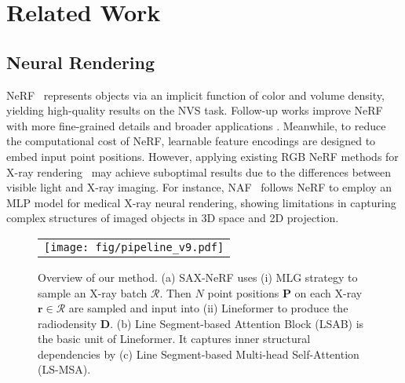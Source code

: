 \documentclass[10pt,twocolumn,letterpaper]{article}
\begin{document}
\vspace{-0.3mm}
\section{Related Work}
\label{sec:rela}
\vspace{-0.2mm}

\subsection{Neural Rendering}
\vspace{-0.2mm}

NeRF~\cite{nerf} represents objects via an implicit function of color and volume density, yielding high-quality results on the NVS task. 
Follow-up works improve NeRF with more fine-grained details \cite{mipnerf21, barron2022mipnerf360} and broader applications  \cite{chen2022hallucinated, xu2022point, wang2022rodin}.
Meanwhile, to reduce the computational cost of NeRF, learnable feature encodings \cite{instant_ngp, tensorf, chen2023neurbf} are designed to embed input point positions.
However, applying existing RGB NeRF methods for X-ray rendering~\cite{naf,mednerf,neat} may achieve suboptimal results due to the differences between visible light and X-ray imaging. For instance, NAF~\cite{naf} follows NeRF to employ an MLP model for medical X-ray neural rendering, showing limitations in capturing complex structures of imaged objects in 3D space and 2D projection.


\begin{figure*}[htp]
	\begin{center}
		\begin{tabular}[t]{c} \hspace{-2.8mm}
			\texttt{[image: fig/pipeline\_v9.pdf]}
		\end{tabular}
	\end{center}
	\vspace*{-6mm}
	\caption{\small Overview of our method. (a) SAX-NeRF uses (i) MLG strategy to sample an X-ray batch $\mathcal{R}$. Then $N$ point positions $\mathbf{P}$ on each X-ray $\mathbf{r} \in \mathcal{R}$ are sampled and input into (ii) Lineformer to produce the radiodensity $\mathbf{D}$. (b) Line Segment-based Attention Block (LSAB) is the basic unit of Lineformer. It captures inner structural dependencies by (c) Line Segment-based Multi-head Self-Attention (LS-MSA). }
	\label{fig:pipeline}
	\vspace{-2mm}
\end{figure*}
\end{document}
